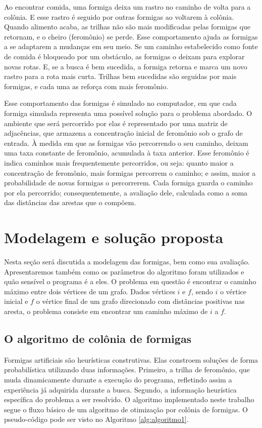 \documentclass[a4paper, 12pt]{article}
\begin{document}
Ao encontrar comida, uma formiga deixa um rastro no caminho de volta para a colônia. E esse rastro é seguido por outras formigas ao voltarem à colônia. Quando alimento acaba, as trilhas não são mais modificadas pelas formigas que retornam, e o cheiro (feromônio) se perde. Esse comportamento ajuda as formigas a se adaptarem a mudanças em seu meio. Se um caminho estabelecido como fonte de comida é bloqueado por um obstáculo, as formigas o deixam para explorar novas rotas. E, se a busca é bem sucedida, a formiga retorna e marca um novo rastro para a rota mais curta. Trilhas bem sucedidas são seguidas por mais formigas, e cada uma as reforça com mais feromônio.

Esse comportamento das formigas é simulado no computador, em que cada formiga simulada representa uma possível solução para o problema abordado. O ambiente que será percorrido por elas é representado por uma matriz de adjacências, que armazena a concentração inicial de feromônio sob o grafo de entrada. À medida em que as formigas vão percorrendo o seu caminho, deixam uma taxa constante de feromônio, acumulada à taxa anterior. Esse feromônio é indica caminhos mais frequentemente percorridos, ou seja: quanto maior a concentração de feromônio, mais formigas percorrem o caminho; e assim, maior a probabilidade de novas formigas o percorrerem. Cada formiga guarda o caminho por ela percorrido; consequentemente, a avaliação dele, calculada como a soma das distâncias das arestas que o compõem.

\section{Modelagem e solução proposta}

Nesta seção será discutida a modelagem das formigas, bem como sua avaliação. Apresentaremos também como os parâmetros do algoritmo foram utilizados e quão sensível o programa é a eles.
O problema em questão é encontrar o caminho máximo entre dois vértices de um grafo. Dados vértices $i$ e $ f$, sendo $i$ o vértice inicial e $f$ o vértice final de um grafo direcionado com distâncias positivas nas aresta, o problema consiste em encontrar um caminho máximo de $i$ a $f$.

\subsection{O algoritmo de colônia de formigas}
 Formigas artificiais são heurísticas construtivas. Elas constroem soluções de forma probabilística utilizando duas informações. Primeiro, a trilha de feromônio, que muda dinamicamente durante a execução do programa, refletindo assim a experiência já adquirida durante a busca. Segundo, a informação heurística específica do problema a ser resolvido. 
 O algoritmo implementado neste trabalho segue o fluxo básico de um algoritmo de otimização por colônia de formigas. O pseudo-código pode ser visto no Algoritmo \ref{alg:algoritmo1}.
\end{document}
